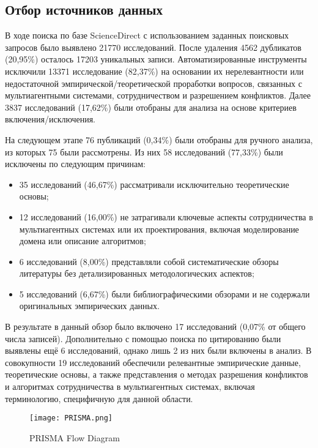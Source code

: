 \subsection{Отбор источников данных}

В ходе поиска по базе ScienceDirect с использованием заданных поисковых запросов было выявлено 21770 исследований.
После удаления 4562 дубликатов (20,95\%) осталось 17203 уникальных записи.
Автоматизированные инструменты исключили 13371 исследование (82,37\%)
на основании их нерелевантности или недостаточной эмпирической/теоретической проработки вопросов,
связанных с мультиагентными системами, сотрудничеством и разрешением конфликтов.
Далее 3837 исследований (17,62\%) были отобраны для анализа на основе критериев включения/исключения.

На следующем этапе 76 публикаций (0,34\%) были отобраны для ручного анализа, из которых 75 были рассмотрены.
Из них 58 исследований (77,33\%) были исключены по следующим причинам:

\begin{itemize}
  \item 35 исследований (46,67\%) рассматривали исключительно теоретические основы;
  \item 12 исследований (16,00\%) не затрагивали ключевые аспекты сотрудничества в мультиагентных системах
    или их проектирования, включая моделирование домена или описание алгоритмов;
  \item 6 исследований (8,00\%) представляли собой систематические обзоры литературы без детализированных методологических аспектов;
  \item 5 исследований (6,67\%) были библиографическими обзорами и не содержали оригинальных эмпирических данных.
\end{itemize}

В результате в данный обзор было включено 17 исследований (0,07\% от общего числа записей).
Дополнительно с помощью поиска по цитированию были выявлены ещё 6 исследований, однако лишь 2 из них были включены в анализ.
В совокупности 19 исследований обеспечили релевантные эмпирические данные, теоретические основы,
а также представления о методах разрешения конфликтов и алгоритмах сотрудничества в мультиагентных системах,
включая терминологию, специфичную для данной области.

\begin{figure}
  \centering
  \texttt{[image: PRISMA.png]}
  \caption{PRISMA Flow Diagram}
  \label{fig:PRISMA}
\end{figure}

